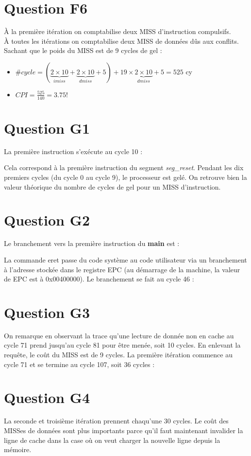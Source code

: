 \documentclass[10pt]{article}
\begin{document}
\section{Question F6}
À la première itération on comptabilise deux MISS d'instruction compulsifs.\\
À toutes les itérations on comptabilise deux MISS de données dûs aux conflits.\\
Sachant que le poids du MISS est de 9 cycles de gel :
\begin{itemize}
  \item $\#cycle=(\underbrace{2\times{10}}_{imiss}+
    \underbrace{2\times{10}}_{dmiss}+5)+
    {19}\times\underbrace{2\times{10}}_{dmiss}+5=525$ cy
  \item ${CPI}=\frac{525}{140}=3.75$!
\end{itemize}

\section{Question G1}
La première instruction s'exécute au cycle 10 :

Cela correspond à la première instruction du segment {\it seg\_reset}. Pendant
les dix premiers cycles (du cycle 0 au cycle 9), le processeur est gelé. On
retrouve bien la valeur théorique du nombre de cycles de gel pour un MISS
d'instruction.

\section{Question G2}
Le branchement vers la première instruction du {\bf main} est :

La commande eret passe du code système au code utilisateur via un branchement
à l'adresse stockée dans le registre EPC (au démarrage de la machine, la valeur
de EPC est à 0x00400000). Le branchement se fait au cycle 46 :


\section{Question G3}
On remarque en observant la trace qu'une lecture de donnée non en cache au
cycle 71 prend jusqu'au cycle 81 pour être menée, soit 10 cycles. En enlevant
la requête, le coût du MISS est de 9 cycles.
La première itération commence au cycle 71 et se termine au cycle 107, soit
36 cycles :
\newpage


\newpage

\section{Question G4}
La seconde et troisième itération prennent chaqu'une 30 cycles. Le coût des
MISSes de données sont plus importants parce qu'il faut maintenant invalider la
ligne de cache dans la case où on veut charger la nouvelle ligne depuis la
mémoire.
\end{document}
